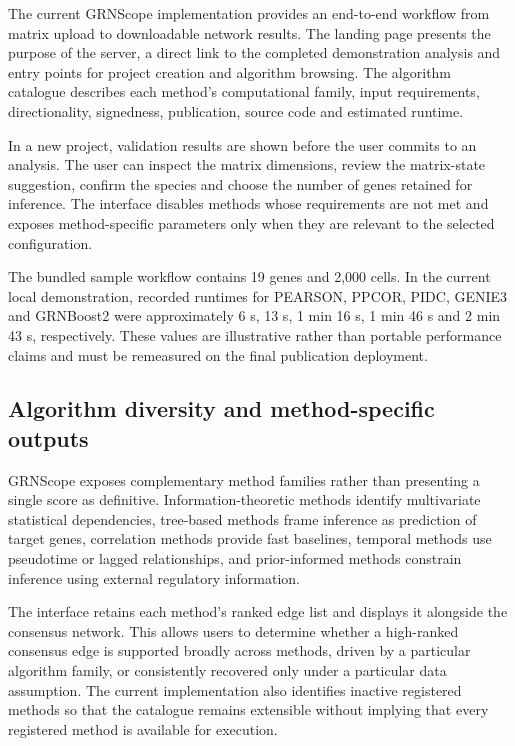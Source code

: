 \documentclass[unnumsec,webpdf,modern,large]{oup-authoring-template}%
\begin{document}
The current GRNScope implementation provides an end-to-end workflow from matrix upload to downloadable network results. The landing page presents the purpose of the server, a direct link to the completed demonstration analysis and entry points for project creation and algorithm browsing. The algorithm catalogue describes each method's computational family, input requirements, directionality, signedness, publication, source code and estimated runtime.

In a new project, validation results are shown before the user commits to an analysis. The user can inspect the matrix dimensions, review the matrix-state suggestion, confirm the species and choose the number of genes retained for inference. The interface disables methods whose requirements are not met and exposes method-specific parameters only when they are relevant to the selected configuration.

The bundled sample workflow contains 19 genes and 2,000 cells. In the current local demonstration, recorded runtimes for PEARSON, PPCOR, PIDC, GENIE3 and GRNBoost2 were approximately 6 s, 13 s, 1 min 16 s, 1 min 46 s and 2 min 43 s, respectively. These values are illustrative rather than portable performance claims and must be remeasured on the final publication deployment.

\subsection{Algorithm diversity and method-specific outputs}

GRNScope exposes complementary method families rather than presenting a single score as definitive. Information-theoretic methods identify multivariate statistical dependencies, tree-based methods frame inference as prediction of target genes, correlation methods provide fast baselines, temporal methods use pseudotime or lagged relationships, and prior-informed methods constrain inference using external regulatory information.

The interface retains each method's ranked edge list and displays it alongside the consensus network. This allows users to determine whether a high-ranked consensus edge is supported broadly across methods, driven by a particular algorithm family, or consistently recovered only under a particular data assumption. The current implementation also identifies inactive registered methods so that the catalogue remains extensible without implying that every registered method is available for execution.
\end{document}
